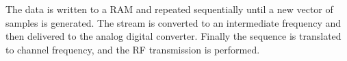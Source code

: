 
The data is written to a RAM and repeated sequentially until a new vector of samples is generated. The stream is converted to an intermediate frequency and then delivered to the analog digital converter. Finally the sequence is translated to channel frequency, and the RF transmission is performed. \par


